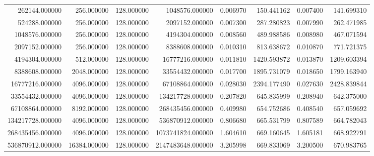 \begin{tabular}{rrrrrrrr}
262144.000000 & 256.000000 & 128.000000 & 1048576.000000 & 0.006970 & 150.441162 & 0.007400 & 141.699310 \\
524288.000000 & 256.000000 & 128.000000 & 2097152.000000 & 0.007300 & 287.280823 & 0.007990 & 262.471985 \\
1048576.000000 & 256.000000 & 128.000000 & 4194304.000000 & 0.008560 & 489.988586 & 0.008980 & 467.071594 \\
2097152.000000 & 256.000000 & 128.000000 & 8388608.000000 & 0.010310 & 813.638672 & 0.010870 & 771.721375 \\
4194304.000000 & 512.000000 & 128.000000 & 16777216.000000 & 0.011810 & 1420.593872 & 0.013870 & 1209.603394 \\
8388608.000000 & 2048.000000 & 128.000000 & 33554432.000000 & 0.017700 & 1895.731079 & 0.018650 & 1799.163940 \\
16777216.000000 & 4096.000000 & 128.000000 & 67108864.000000 & 0.028030 & 2394.177490 & 0.027630 & 2428.839844 \\
33554432.000000 & 4096.000000 & 128.000000 & 134217728.000000 & 0.207820 & 645.835999 & 0.208940 & 642.375000 \\
67108864.000000 & 8192.000000 & 128.000000 & 268435456.000000 & 0.409980 & 654.752686 & 0.408540 & 657.059692 \\
134217728.000000 & 4096.000000 & 128.000000 & 536870912.000000 & 0.806680 & 665.531799 & 0.807589 & 664.782043 \\
268435456.000000 & 4096.000000 & 128.000000 & 1073741824.000000 & 1.604610 & 669.160645 & 1.605181 & 668.922791 \\
536870912.000000 & 16384.000000 & 128.000000 & 2147483648.000000 & 3.205998 & 669.833069 & 3.200500 & 670.983765 \\
\bottomrule
\end{tabular}
